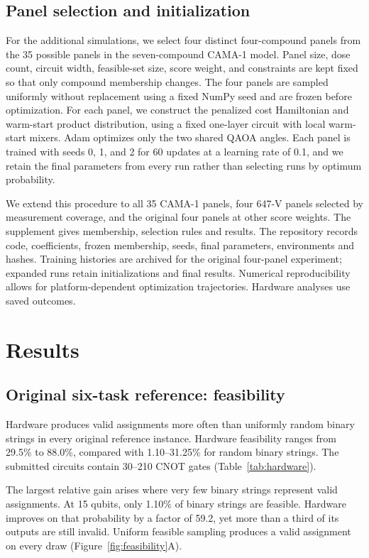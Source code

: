 \documentclass[utf8]{FrontiersinHarvard}
\begin{document}
\subsection{Panel selection and initialization}
For the additional simulations, we select four distinct four-compound panels from the 35 possible panels in the seven-compound CAMA-1 model. Panel size, dose count, circuit width, feasible-set size, score weight, and constraints are kept fixed so that only compound membership changes. The four panels are sampled uniformly without replacement using a fixed NumPy seed and are frozen before optimization. For each panel, we construct the penalized cost Hamiltonian and warm-start product distribution, using a fixed one-layer circuit with local warm-start mixers. Adam optimizes only the two shared QAOA angles. Each panel is trained with seeds 0, 1, and 2 for 60 updates at a learning rate of 0.1, and we retain the final parameters from every run rather than selecting runs by optimum probability.

We extend this procedure to all 35 CAMA-1 panels, four 647-V panels selected by measurement coverage, and the original four panels at other score weights. The supplement gives membership, selection rules and results. The repository records code, coefficients, frozen membership, seeds, final parameters, environments and hashes. Training histories are archived for the original four-panel experiment; expanded runs retain initializations and final results. Numerical reproducibility allows for platform-dependent optimization trajectories. Hardware analyses use saved outcomes.

\section{Results}
\subsection{Original six-task reference: feasibility}
Hardware produces valid assignments more often than uniformly random binary strings in every original reference instance. Hardware feasibility ranges from 29.5\% to 88.0\%, compared with 1.10--31.25\% for random binary strings. The submitted circuits contain 30--210 CNOT gates (Table~\ref{tab:hardware}).

The largest relative gain arises where very few binary strings represent valid assignments. At 15 qubits, only 1.10\% of binary strings are feasible. Hardware improves on that probability by a factor of 59.2, yet more than a third of its outputs are still invalid. Uniform feasible sampling produces a valid assignment on every draw (Figure~\ref{fig:feasibility}A).
\end{document}
